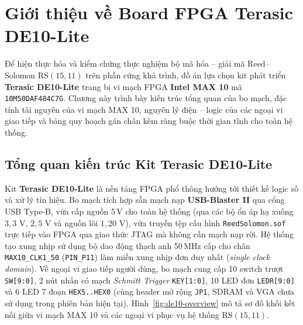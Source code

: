 
\chapter{Giới thiệu về Board FPGA Terasic DE10-Lite}
\label{ch:de10-lite}

Để hiện thực hóa và kiểm chứng thực nghiệm bộ mã hóa -- giải mã Reed--Solomon $\mathrm{RS}(15,11)$ trên phần cứng khả trình, đồ án lựa chọn kit phát triển \textbf{Terasic DE10-Lite} trang bị vi mạch FPGA \textbf{Intel MAX 10} mã \texttt{10M50DAF484C7G}. Chương này trình bày kiến trúc tổng quan của bo mạch, đặc tính tài nguyên của vi mạch MAX 10, nguyên lý điện -- logic của các ngoại vi giao tiếp và bảng quy hoạch gán chân kèm ràng buộc thời gian tĩnh cho toàn hệ thống.

\section{Tổng quan kiến trúc Kit Terasic DE10-Lite}
\label{sec:de10-overview}

Kit \textbf{Terasic DE10-Lite} là nền tảng FPGA phổ thông hướng tới thiết kế logic số và xử lý tín hiệu. Bo mạch tích hợp sẵn mạch nạp \textbf{USB-Blaster II} qua cổng USB Type-B, vừa cấp nguồn 5\,V cho toàn hệ thống (qua các bộ ổn áp hạ xuống $3{,}3\text{ V}$, $2{,}5\text{ V}$ và nguồn lõi $1{,}20\text{ V}$), vừa truyền tệp cấu hình \texttt{ReedSolomon.sof} trực tiếp vào FPGA qua giao thức JTAG mà không cần mạch nạp rời. Hệ thống tạo xung nhịp sử dụng bộ dao động thạch anh 50\,MHz cấp cho chân \texttt{MAX10\_CLK1\_50} (\texttt{PIN\_P11}) làm miền xung nhịp đơn duy nhất (\textit{single clock domain}). Về ngoại vi giao tiếp người dùng, bo mạch cung cấp 10 switch trượt \texttt{SW[9:0]}, 2 nút nhấn có mạch \textit{Schmitt Trigger} \texttt{KEY[1:0]}, 10 LED đơn \texttt{LEDR[9:0]} và 6 LED 7 đoạn \texttt{HEX5..HEX0} (cùng header mở rộng \texttt{JP1}, SDRAM và VGA chưa sử dụng trong phiên bản hiện tại). Hình~\ref{fig:de10-overview} mô tả sơ đồ khối kết nối giữa vi mạch MAX 10 và các ngoại vi phục vụ hệ thống $\mathrm{RS}(15,11)$.

